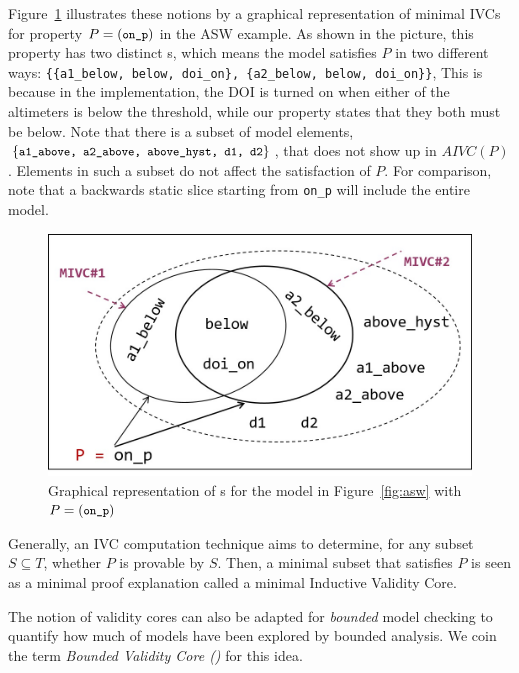 Figure~\ref{fig:ivcs} illustrates these notions by a graphical representation of minimal IVCs for property $P = ({\small{\texttt{on\_p}}})$ in the ASW example. As shown in the picture, this property has two distinct \mivc s, which means the model satisfies $P$ in two different ways:  {\small \texttt{\{\{a1\_below, below, doi\_on\}, \{a2\_below, below, doi\_on\}\}}}, This is because in the implementation, the DOI is turned on when either of the altimeters is below the threshold, while our property states that they both must be below.
Note that there is a subset of model elements, $\{{\small \texttt{a1\_above, a2\_above, above\_hyst, d1, d2}}\}$, that does not show up in $AIVC(P)$. Elements in such a subset
do not affect the satisfaction of $P$.  For comparison, note that a backwards static slice starting from {\small{\texttt{on\_p}}} will include the entire model.

\begin{figure}[t]
 \centering
  \includegraphics[width=0.70\columnwidth]{figs/ivcs.jpg}
  \vspace{-0.1in}
  \caption{Graphical representation of \mivc s for the model in Figure~\ref{fig:asw}
  with  $P = ({\small \texttt{on\_p}})$}
  \label{fig:ivcs}
\end{figure}


Generally, an IVC computation technique aims to determine, for any subset $S \subseteq T$, whether $P$ is provable by $S$. Then, a minimal subset that satisfies $P$ is seen as a minimal proof explanation called a minimal Inductive Validity Core.

The notion of validity cores can also be adapted for \emph{bounded} model checking to quantify how much of models have been explored by bounded analysis. We coin the term \emph{Bounded Validity Core (\bvc)} for this idea.

